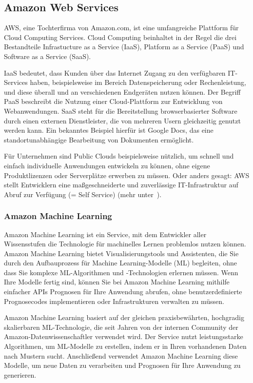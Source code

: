\subsection{Amazon Web Services}
AWS, eine Tochterfirma von Amazon.com, ist eine umfangreiche Plattform für Cloud Computing Services. Cloud Computing
beinhaltet in der Regel die drei Bestandteile Infrastucture as a Service (IaaS), Platform as a Service (PaaS) und
Software as a Service (SaaS).

IaaS bedeutet, dass Kunden über das Internet Zugang zu den verfügbaren IT-Services haben, beispielsweise im Bereich
Datenspeicherung oder Rechenleistung, und diese überall und an verschiedenen Endgeräten nutzen können. Der Begriff PaaS
beschreibt die Nutzung einer Cloud-Plattform zur Entwicklung von Webanwendungen. SaaS steht für die Bereitstellung
browserbasierter Software durch einen externen Dienstleister, die von mehreren Usern gleichzeitig genutzt werden kann.
Ein bekanntes Beispiel hierfür ist Google Docs, das eine standortunabhängige Bearbeitung von Dokumenten ermöglicht.

Für Unternehmen sind Public Clouds beispielsweise nützlich, um schnell und einfach individuelle Anwendungen entwickeln
zu können, ohne eigene Produktlizenzen oder Serverplätze erwerben zu müssen. Oder anders gesagt: AWS stellt Entwicklern
eine maßgeschneiderte und zuverlässige IT-Infrastruktur auf Abruf zur Verfügung (= Self Service)
(mehr unter~\cite{online_grundlagen_aws}).

\subsubsection{Amazon Machine Learning}
Amazon Machine Learning ist ein Service, mit dem Entwickler aller Wissensstufen die Technologie für machinelles Lernen
problemlos nutzen können. Amazon Machine Learning bietet Visualisierungstools und Assistenten, die Sie durch den
Aufbauprozess für Machine Learning-Modelle (ML) begleiten, ohne dass Sie komplexe ML-Algorithmen und ‑Technologien
erlernen müssen. Wenn Ihre Modelle fertig sind, können Sie bei Amazon Machine Learning mithilfe einfacher APIs Prognosen
für Ihre Anwendung abrufen, ohne benutzerdefinierte Prognosecodes implementieren oder Infrastrukturen verwalten zu müssen.

Amazon Machine Learning basiert auf der gleichen praxisbewährten, hochgradig skalierbaren ML-Technologie, die seit Jahren
von der internen Community der Amazon-Datenwissenschaftler verwendet wird. Der Service nutzt leistungsstarke Algorithmen,
um ML-Modelle zu erstellen, indem er in Ihren vorhandenen Daten nach Mustern sucht. Anschließend verwendet Amazon Machine
Learning diese Modelle, um neue Daten zu verarbeiten und Prognosen für Ihre Anwendung zu generieren.


